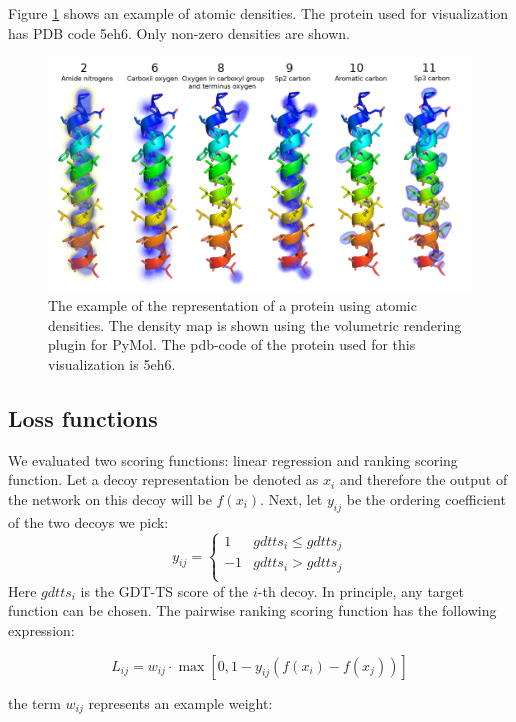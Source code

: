 \documentclass[a4paper,10pt]{article}
\begin{document}
Figure \ref{Fig:atomic_densities} shows an example of atomic densities. 
The protein used for visualization has PDB code 5eh6. Only non-zero densities are shown.

\begin{figure}[H]
    \centering
    \includegraphics[width=\linewidth]{Fig/atomic_densities.png}
    \caption{The example of the representation of a protein using atomic densities. The density map is 
    shown using the volumetric rendering plugin for PyMol. The pdb-code of the protein used for this visualization is 5eh6.}
    \label{Fig:atomic_densities}
\end{figure}

\subsection{Loss functions}
We evaluated two scoring functions: linear regression and ranking scoring function. 
Let a decoy representation be denoted as $x_i$ and therefore the output
of the network on this decoy will be $f(x_i)$. Next, let $y_{ij}$ be the ordering coefficient of the two decoys we pick: 
$$
y_{ij} = \begin{cases}
               1& gdtts_i \leq gdtts_j \\
               -1& gdtts_i > gdtts_j \\
            \end{cases}
$$
Here $gdtts_i$ is the GDT-TS score of the $i$-th decoy. In principle, any target function can be chosen. 
The pairwise ranking scoring function has the following expression:

$$ L_{ij} = w_{ij} \cdot \max \left[ 0, 1 - y_{ij} \left( f \left( x_i \right) - f \left( x_j \right) \right) \right] $$

the term $w_{ij}$ represents an example weight:
\end{document}
